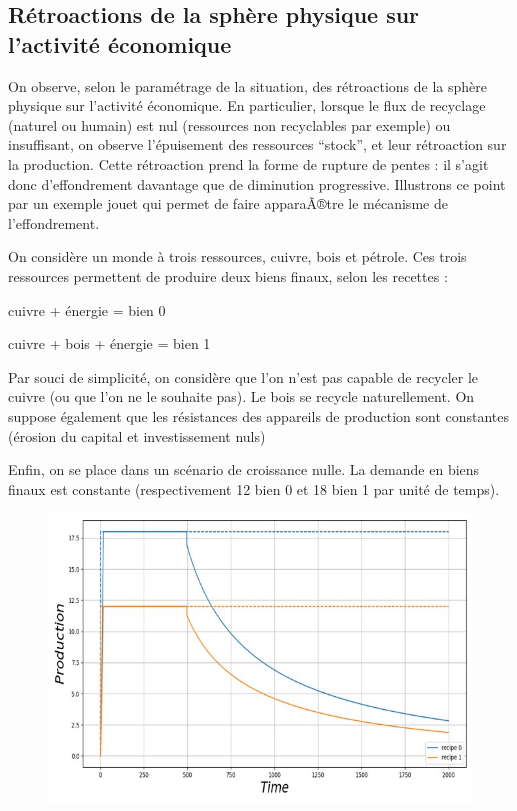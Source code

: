 \documentclass[12pt,a4paper]{article}%
\begin{document}
\subsection{Rétroactions de la sphère physique sur l'activité économique}

On observe, selon le paramétrage de la situation, des rétroactions de la
sphère physique sur l'activité économique. En particulier, lorsque le flux
de recyclage (naturel ou humain) est nul (ressources non recyclables par
exemple) ou insuffisant, on observe l'épuisement des ressources "`stock"', et
leur rétroaction sur la production. Cette rétroaction prend la forme de
rupture de pentes : il s'agit donc d'effondrement davantage que de diminution
progressive. Illustrons ce point par un exemple jouet qui permet de faire
apparaÃ®tre le mécanisme de l'effondrement.

On considère un monde à trois ressources, cuivre, bois et pétrole. Ces
trois ressources permettent de produire deux biens finaux, selon les recettes :

\textbullet\qquad cuivre + énergie = bien 0

\textbullet\qquad cuivre + bois + énergie = bien 1

Par souci de simplicité, on considère que l'on n'est pas capable de
recycler le cuivre (ou que l'on ne le souhaite pas). Le bois se recycle
naturellement. On suppose également que les résistances des appareils de
production sont constantes (érosion du capital et investissement nuls)

Enfin, on se place dans un scénario de croissance nulle. La demande en biens
finaux est constante (respectivement 12 bien 0 et 18 bien 1 par unité de temps).

\begin{figure}[h]
\centering
\includegraphics[width=1.0\textwidth]{figures/Production7.jpg}\end{figure}
\end{document}
